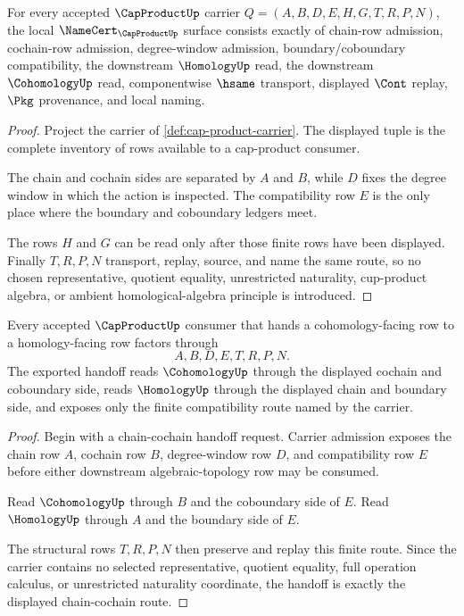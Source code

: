 \begin{theorem}\label{thm:cap-product-namecert-obligations}
For every accepted $\CapProductUp$ carrier $Q=(A,B,D,E,H,G,T,R,P,N)$, the local $\NameCert_{\CapProductUp}$ surface consists exactly of chain-row admission, cochain-row admission, degree-window admission, boundary/coboundary compatibility, the downstream $\HomologyUp$ read, the downstream $\CohomologyUp$ read, componentwise $\hsame$ transport, displayed $\Cont$ replay, $\Pkg$ provenance, and local naming.
\end{theorem}
\begin{proof}
Project the carrier of \autoref{def:cap-product-carrier}. The displayed tuple is the complete inventory of rows available to a cap-product consumer.

The chain and cochain sides are separated by $A$ and $B$, while $D$ fixes the degree window in which the action is inspected. The compatibility row $E$ is the only place where the boundary and coboundary ledgers meet.

The rows $H$ and $G$ can be read only after those finite rows have been displayed. Finally $T,R,P,N$ transport, replay, source, and name the same route, so no chosen representative, quotient equality, unrestricted naturality, cup-product algebra, or ambient homological-algebra principle is introduced.
\end{proof}

\begin{theorem}\label{thm:cap-product-chain-cochain-handoff}
Every accepted $\CapProductUp$ consumer that hands a cohomology-facing row to a homology-facing row factors through
$$
A,B,D,E,T,R,P,N .
$$
The exported handoff reads $\CohomologyUp$ through the displayed cochain and coboundary side, reads $\HomologyUp$ through the displayed chain and boundary side, and exposes only the finite compatibility route named by the carrier.
\end{theorem}
\begin{proof}
Begin with a chain-cochain handoff request. Carrier admission exposes the chain row $A$, cochain row $B$, degree-window row $D$, and compatibility row $E$ before either downstream algebraic-topology row may be consumed.

Read $\CohomologyUp$ through $B$ and the coboundary side of $E$. Read $\HomologyUp$ through $A$ and the boundary side of $E$.

The structural rows $T,R,P,N$ then preserve and replay this finite route. Since the carrier contains no selected representative, quotient equality, full operation calculus, or unrestricted naturality coordinate, the handoff is exactly the displayed chain-cochain route.
\end{proof}

